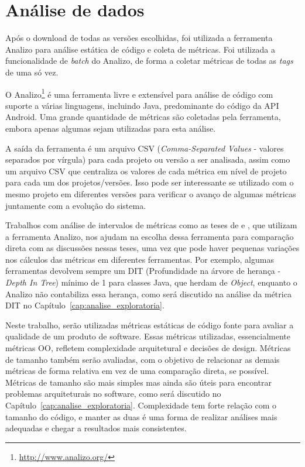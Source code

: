 \section{Análise de dados}

Após o download de todas as versões escolhidas, foi utilizada a ferramenta Analizo para análise estática de código e coleta de métricas. Foi utilizada a funcionalidade de \textit{batch} do Analizo, de forma a coletar métricas de todas as \textit{tags} de uma só vez. 

O Analizo\footnote{\url{http://www.analizo.org/}} é uma ferramenta livre e extensível para análise de código com suporte a várias linguagens, incluindo Java, predominante do código da API Android. Uma grande quantidade de métricas são coletadas pela ferramenta, embora apenas algumas sejam utilizadas para esta análise.

A saída da ferramenta é um arquivo CSV (\textit{Comma-Separated Values} - valores separados por vírgula) para cada projeto ou versão a ser analisada, assim como um arquivo CSV que centraliza os valores de cada métrica em nível de projeto para cada um dos projetos/versões. Isso pode ser interessante se utilizado com o mesmo projeto em diferentes versões para verificar o avanço de algumas métricas juntamente com a evolução do sistema.

Trabalhos com análise de intervalos de métricas como as teses de  e , que utilizam a ferramenta Analizo, nos ajudam na escolha dessa ferramenta para comparação direta com as discussões nessas teses, uma vez que pode haver pequenas variações nos cálculos das métricas em diferentes ferramentas. Por exemplo, algumas ferramentas devolvem sempre um DIT (Profundidade na árvore de herança - \textit{Depth In Tree}) mínimo de 1 para classes Java, que herdam de \textit{Object}, enquanto o Analizo não contabiliza essa herança, como será discutido na análise da métrica DIT no Capítulo~\ref{cap:analise_exploratoria}.

Neste trabalho, serão utilizadas métricas estáticas de código fonte para avaliar a qualidade de um produto de software. Essas métricas utilizadas, essencialmente métricas OO, refletem complexidade arquitetural e decisões de design. Métricas de tamanho também serão avaliadas, com o objetivo de relacionar as demais métricas de forma relativa em vez de uma comparação direta, se possível. Métricas de tamanho são mais simples mas ainda são úteis para encontrar problemas arquiteturais no software, como será discutido no Capítulo~\ref{cap:analise_exploratoria}. Complexidade tem forte relação com o tamanho do código, e manter as duas é uma forma de realizar análises mais adequadas e chegar a resultados mais consistentes.

